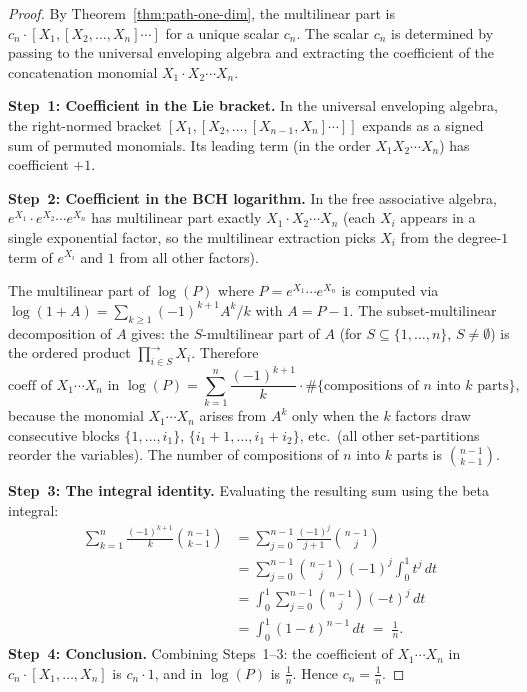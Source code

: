 \begin{proof}
By Theorem~\ref{thm:path-one-dim}, the multilinear part is
$c_n\cdot[X_1,[X_2,\ldots,X_n]\cdots]$ for a unique scalar $c_n$. The
scalar $c_n$ is determined by passing to the universal enveloping
algebra and extracting the coefficient of the concatenation monomial
$X_1\cdot X_2\cdots X_n$.

\medskip\noindent\textbf{Step~1: Coefficient in the Lie bracket.}
In the universal enveloping algebra, the right-normed bracket
$[X_1,[X_2,\ldots,[X_{n-1},X_n]\cdots]]$ expands as a signed sum of
permuted monomials. Its leading term (in the order
$X_1X_2\cdots X_n$) has coefficient $+1$.

\medskip\noindent\textbf{Step~2: Coefficient in the BCH logarithm.}
In the free associative algebra, $e^{X_1}\cdot e^{X_2}\cdots e^{X_n}$
has multilinear part exactly $X_1\cdot X_2\cdots X_n$ (each $X_i$
appears in a single exponential factor, so the multilinear extraction
picks $X_i$ from the degree-$1$ term of $e^{X_i}$ and $1$ from all
other factors).

The multilinear part of $\log(P)$ where $P=e^{X_1}\cdots e^{X_n}$ is
computed via $\log(1+A)=\sum_{k\ge 1}(-1)^{k+1}A^k/k$ with $A=P-1$.
The subset-multilinear decomposition of $A$ gives: the
$S$-multilinear part of $A$ (for $S\subseteq\{1,\ldots,n\}$,
$S\neq\emptyset$) is the ordered product $\prod_{i\in S}^{\to}X_i$.
Therefore
\[
\text{coeff of }X_1\cdots X_n\text{ in }\log(P)
=
\sum_{k=1}^{n}\frac{(-1)^{k+1}}{k}
\cdot
\#\{\text{compositions of }n\text{ into }k\text{ parts}\},
\]
because the monomial $X_1\cdots X_n$ arises from $A^k$ only when the
$k$ factors draw consecutive blocks $\{1,\ldots,i_1\}$,
$\{i_1{+}1,\ldots,i_1{+}i_2\}$, etc.\ (all other set-partitions
reorder the variables). The number of compositions of $n$ into $k$
parts is $\binom{n-1}{k-1}$.

\medskip\noindent\textbf{Step~3: The integral identity.}
Evaluating the resulting sum using the beta integral:
\begin{align*}
\sum_{k=1}^{n}\frac{(-1)^{k+1}}{k}\binom{n-1}{k-1}
&=
\sum_{j=0}^{n-1}\frac{(-1)^{j}}{j+1}\binom{n-1}{j}\\
&=
\sum_{j=0}^{n-1}\binom{n-1}{j}(-1)^j\int_0^1 t^j\,dt\\
&=
\int_0^1\sum_{j=0}^{n-1}\binom{n-1}{j}(-t)^j\,dt\\
&=
\int_0^1(1-t)^{n-1}\,dt
\;=\;\frac{1}{n}.
\end{align*}
\textbf{Step~4: Conclusion.}
Combining Steps~1--3: the coefficient of $X_1\cdots X_n$ in
$c_n\cdot[X_1,\ldots,X_n]$ is $c_n\cdot 1$, and in $\log(P)$ is
$\frac{1}{n}$. Hence $c_n=\frac{1}{n}$.
\end{proof}

